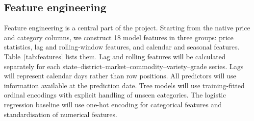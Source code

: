 \documentclass[12pt,a4paper]{article}
\begin{document}
\subsection{Feature engineering}
Feature engineering is a central part of the project. Starting from the native price and category columns, we construct 18 model features in three groups: price statistics, lag and rolling-window features, and calendar and seasonal features. Table~\ref{tab:features} lists them. Lag and rolling features will be calculated separately for each state--district--market--commodity--variety--grade series. Lags will represent calendar days rather than row positions. All predictors will use information available at the prediction date. Tree models will use training-fitted ordinal encodings with explicit handling of unseen categories. The logistic regression baseline will use one-hot encoding for categorical features and standardisation of numerical features.
\end{document}

